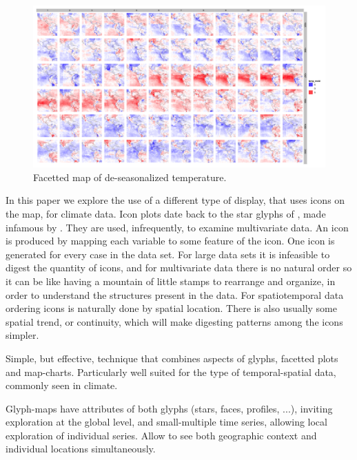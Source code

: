 \documentclass[oneside]{article}
\begin{document}
\begin{figure}[htp]
\centerline{\includegraphics[width=6in]{nasa-colored-map.png}}
\caption{Facetted map of de-seasonalized temperature.}
\label{fig:facetted-map}
\end{figure}

In this paper we explore the use of a different type of display, that uses icons on the map, for climate data. Icon plots date back to the star glyphs of  \citep{kleiner}, made infamous by \citep{Chernoff}. They are used, infrequently, to examine multivariate data. An icon is produced by mapping each variable to some feature of the icon. One icon is generated for every case in the data set. For large data sets it is infeasible to digest the quantity of icons, and for multivariate data there is no natural order so it can be like having a mountain of little stamps to rearrange and organize, in order to understand the structures present in the data. For spatiotemporal data ordering icons is naturally done by spatial location. There is also usually some spatial trend, or continuity, which will make digesting patterns among the icons simpler.


Simple, but effective, technique that combines aspects of glyphs, facetted plots and map-charts. Particularly well suited for the type of temporal-spatial data, commonly seen in climate.

Glyph-maps have attributes of both glyphs (stars, faces, profiles, ...), inviting exploration at the global level, and small-multiple time series, allowing local exploration of individual series. Allow to see both geographic context and individual locations simultaneously.
\end{document}

